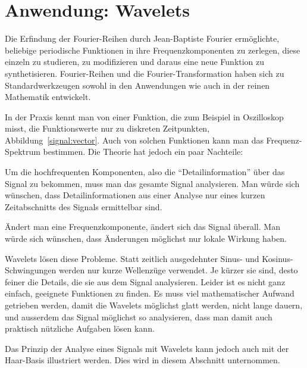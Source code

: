 %
%
%
\section{Anwendung: Wavelets\label{section-wavelets}}
Die Erfindung der Fourier-Reihen durch Jean-Baptiste Fourier ermöglichte,
beliebige periodische Funktionen in ihre Frequenzkomponenten zu zerlegen,
diese einzeln zu studieren, zu modifizieren und daraus eine neue Funktion
zu synthetisieren. Fourier-Reihen und die Fourier-Transformation haben
sich zu Standardwerkzeugen sowohl in den Anwendungen wie auch in der
reinen Mathematik entwickelt.

In der Praxis kennt man von einer Funktion, die zum Beispiel in
Oszilloskop misst, die Funktionswerte nur zu diskreten Zeitpunkten,
Abbildung~\ref{signal:vector}.
Auch von solchen Funktionen kann man das Frequenz-Spektrum bestimmen.
Die Theorie hat jedoch ein paar Nachteile:
\begin{compactenum}
\item Um die hochfrequenten Komponenten, also die ``Detailinformation''
über das Signal zu bekommen, muss man das gesamte Signal analysieren.
Man würde sich wünschen, dass Detailinformationen aus einer Analyse
nur eines kurzen Zeitabschnitts des Signals ermittelbar sind.
\item Ändert man eine Frequenzkomponente, ändert sich das Signal
überall. Man würde sich wünschen, dass Änderungen möglichst nur
lokale Wirkung haben.
\end{compactenum}
Wavelets lösen diese Probleme. Statt zeitlich ausgedehnter Sinus-
und Kosinus-Schwingungen werden nur kurze Wellenzüge verwendet.
Je kürzer sie sind, desto feiner die Details, die sie aus dem 
Signal analysieren. Leider ist es nicht ganz einfach, geeignete
Funktionen zu finden. Es muss viel mathematischer Aufwand getrieben
werden, damit die Wavelets möglichst glatt werden, nicht lange
dauern, und ausserdem das Signal möglichst so analysieren, dass
man damit auch praktisch nützliche Aufgaben lösen kann.

Das Prinzip der Analyse eines Signals mit Wavelets kann jedoch
auch mit der Haar-Basis illustriert werden. Dies wird in diesem
Abschnitt unternommen.

